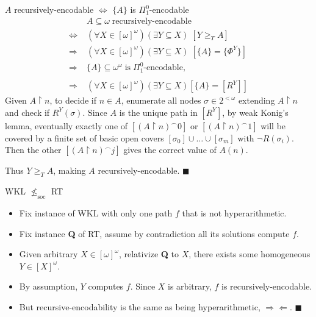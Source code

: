 \begin{frame}{$A$ recursively-encodable $\Leftrightarrow$
$\{A\}$ is $\Pi_1^0$-encodable}
  \begin{align*}
    \;&A\subseteq\omega\; \text{recursively-encodable}\\
    \Leftrightarrow\; & (\forall X\in[\omega]^\omega)(\exists Y\subseteq
      X)\; [Y\geq_T A]\\
    \Rightarrow\; & (\forall X\in[\omega]^\omega)(\exists Y\subseteq X)\;
      [\{A\}=\{\Phi^Y\}]\\
    \Rightarrow\; &\{A\}\subseteq\omega^\omega\; \text{is}\;
      \Pi_1^0\text{-encodable},\\
    &\\
    \Rightarrow\; & (\forall X\in[\omega]^\omega)(\exists Y\subseteq
      X) [\{A\}=[R^Y]]
  \end{align*}
  Given $A\restriction n$, to decide if $n\in A$, enumerate all nodes
  $\sigma\in2^{<\omega}$ extending $A\restriction n$ and check if
  $R^Y(\sigma)$. Since $A$ is the unique path in $[R^Y]$, by weak Konig's
  lemma, eventually exactly one of $[(A\restriction n)^\frown 0]$ or
  $[(A\restriction n)^\frown 1]$ will be covered by a finite set of basic
  open covers $[\sigma_0]\cup\ldots\cup[\sigma_m]$ with $\neg R(\sigma_i)$.
  Then the other $[(A\restriction n)^\frown j]$ gives the correct value
  of $A(n)$.
  \vspace{0.5em}

  Thus $Y\geq_TA$, making $A$ recursively-encodable. $\blacksquare$
\end{frame}

\begin{frame}{WKL $\nleq_{\text{soc}}$ RT}
  \begin{itemize}
    \item Fix instance of WKL with only one path $f$ that is
      not hyperarithmetic.
    \item Fix instance \textbf{Q} of RT, assume by contradiction all
      its solutions compute $f$.
    \item Given arbitrary $X\in[\omega]^\omega$, relativize \textbf{Q} to
      $X$, there exists some homogeneous $Y\in[X]^\omega$.
    \item By assumption, $Y$ computes $f$. Since $X$ is arbitrary, $f$ is
      recursively-encodable.
    \item But recursive-encodability is the same as being
      hyperarithmetic, $\Rightarrow\Leftarrow$. $\blacksquare$
  \end{itemize}
\end{frame}
